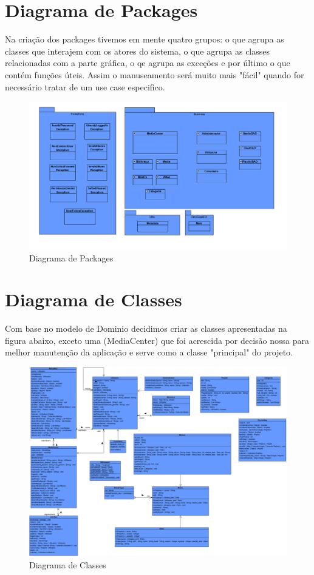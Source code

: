 \documentclass[a4paper]{report}
\begin{document}
\chapter{Diagrama de Packages}

Na criação dos packages tivemos em mente quatro grupos: o que agrupa as classes que 
interajem com os atores do sistema, o que agrupa as classes relacionadas com a
parte gráfica, o qe agrupa as exceções e por último o que contém funções úteis.
Assim o manuseamento será muito mais "fácil" quando for necessário tratar de um use case
especifico.

\begin{figure}[H]
	\centering 
    \includegraphics[width=\textwidth]{images/packages.png}  
    \caption{Diagrama de Packages}
\end{figure}

\chapter{Diagrama de Classes}

Com base no modelo de Dominio decidimos criar as classes apresentadas na figura abaixo,
exceto uma (MediaCenter) que foi acrescida por decisão nossa para melhor manutenção
da aplicação e serve como a classe "principal" do projeto.

\begin{figure}[H]
	\centering 
    \includegraphics[width=\textwidth]{images/classdiagram.png}  
    \caption{Diagrama de Classes}
\end{figure}
\end{document}

